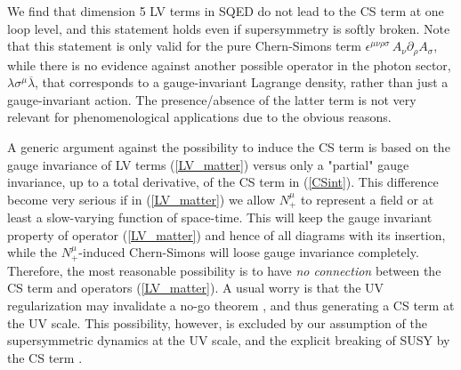 \documentclass[12pt]{revtex4}
\begin{document}
	We find that dimension 5 LV terms in SQED do not lead to the CS term at one loop level,
	and this statement holds even if supersymmetry is softly broken.
 Note that this statement is only valid for the pure Chern-Simons term
$ \epsilon^{\mu\nu\rho\sigma}\, A_\nu \partial_\rho A_\sigma $, 
while there is no evidence against another possible operator in the 
    photon sector,  $ \lambda \sigma^\mu \overline{\lambda} $,
    that corresponds to a gauge-invariant Lagrange density, rather than just a 
    gauge-invariant action. The presence/absence of the latter term is not very relevant for
phenomenological applications due to the obvious reasons. 

A generic argument against the possibility to induce the CS term
    is based on the gauge invariance of  LV terms (\ref{LV_matter})
versus only  a "partial" gauge invariance, up to a total derivative, of the 
    CS term in (\ref{CSint}).
This difference become very serious if in (\ref{LV_matter})
we allow $ N_+^\mu $ to represent a field or at least a slow-varying function
of space-time.  This will keep the gauge invariant property of 
    operator (\ref{LV_matter}) and hence of all diagrams with its insertion,
while the $ N_+^\mu $-induced Chern-Simons will loose gauge invariance completely.
Therefore, the most reasonable possibility is to have {\em no connection} between 
the CS term and operators  (\ref{LV_matter}). A usual worry is that 
the UV regularization may invalidate a no-go theorem \cite{CG}, and thus generating 
    a CS term at the UV scale. This possibility, however, 
is excluded by our assumption of the supersymmetric dynamics at the UV scale, and the 
explicit breaking of SUSY by the CS term \cite{Belich:,GrootNibbelink:2004za}.
\end{document}
